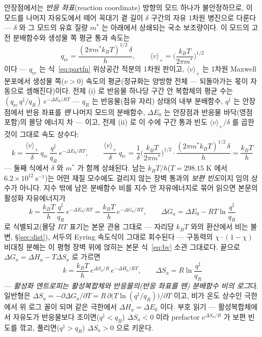 \begin{bgbox}
안장점에서는 \emph{반응 좌표}(reaction coordinate) 방향의 모드 하나가 불안정하므로, 이 모드를 나머지
자유도에서 떼어 꼭대기 곁 길이 $\delta$ 구간의 자유 1차원 병진으로 다룬다 --- $\delta$ 와 그 모드의
유효 질량 $m^{*}$ 는 아래에서 상쇄되는 국소 보조량이다. 이 모드의 고전 분배함수와 생성물 쪽 평균
통과 속도는
\begin{equation}
q_\mathrm{rc}=\frac{(2\pi m^{*}k_BT)^{1/2}\,\delta}{h},\qquad
\langle v\rangle_{+}=\Big(\frac{k_BT}{2\pi m^{*}}\Big)^{\!1/2}
\label{eq:tst-qrc}
\end{equation}
이다 --- $q_\mathrm{rc}$ 는 식~\eqref{eq:partfn} 위상공간 적분의 1차원 판이고, $\langle v\rangle_{+}$ 는
1차원 Maxwell 분포에서 생성물 쪽($v>0$) 속도의 평균(정규화는 양방향 전체 --- 되돌아가는 몫이 자동으로
셈해진다)이다. 전제 (i) 로 반응물 하나당 구간 안 복합체의 평균 수는
$(q_\mathrm{rc}\,q^{\ddagger}/q_R)\,e^{-\Delta E_0/RT}$ --- $q_R$ 는 반응물(점유 자리) 상태의 내부
분배함수, $q^{\ddagger}$ 는 안장점에서 반응 좌표를 \emph{뗀} 나머지 모드의 분배함수, $\Delta E_0$ 는
안장점과 반응물 바닥(영점 포함)의 몰당 에너지 차 --- 이고, 전제 (ii) 로 이 수에 구간 통과 빈도
$\langle v\rangle_{+}/\delta$ 를 곱한 것이 그대로 속도 상수다:
\begin{equation}
k=\frac{\langle v\rangle_{+}}{\delta}\,q_\mathrm{rc}\,\frac{q^{\ddagger}}{q_R}\,e^{-\Delta E_0/RT},
\qquad
\frac{\langle v\rangle_{+}}{\delta}\,q_\mathrm{rc}
=\frac{1}{\delta}\Big(\frac{k_BT}{2\pi m^{*}}\Big)^{\!1/2}
\cdot\frac{(2\pi m^{*}k_BT)^{1/2}\,\delta}{h}
=\frac{k_BT}{h}
\label{eq:tst-freq}
\end{equation}
--- 둘째 식에서 $\delta$ 와 $m^{*}$ 가 함께 상쇄된다. 남는 $k_BT/h$($T=298.15$ K 에서
$6.2\times10^{12}\ \mathrm{s^{-1}}$)는 어떤 재질 모수에도 걸리지 않는 장벽 통과의 \emph{보편 빈도}이지
임의 상수가 아니다\cite{mcquarrie1976}. 지수 밖에 남은 분배함수 비를 지수 안 자유에너지로 묶어 읽으면
본문의 활성화 자유에너지가
\begin{equation}
k=\frac{k_BT}{h}\,\frac{q^{\ddagger}}{q_R}\,e^{-\Delta E_0/RT}
=\frac{k_BT}{h}\,e^{-\Delta G_a/RT},
\qquad
\Delta G_a=\Delta E_0-RT\ln\frac{q^{\ddagger}}{q_R}
\label{eq:tst-k}
\end{equation}
로 식별되고(몰당 $RT$ 표기는 본문 관용 그대로 --- 자리당 $k_BT$ 와의 환산에서 비는 불변,
\S\ref{sec:dist}), 서두의 Eyring 속도식이 그대로 회수된다 --- 구동력의 $\chi\!\cdot\!(1{-}\chi)$
비대칭 분해는 이 평형 장벽 위에 얹히는 본문 식~\eqref{eq:bv} 소관 그대로다. 끝으로
$\Delta G_a=\Delta H_a-T\Delta S_a$ 로 가르면
\begin{equation}
\boxed{\;k=\frac{k_BT}{h}\,e^{\Delta S_a/R}\,e^{-\Delta H_a/RT},\qquad
\Delta S_a=R\ln\frac{q^{\ddagger}}{q_R}\;}
\label{eq:tst-eyring}
\end{equation}
--- \emph{활성화 엔트로피는 활성복합체와 반응물의(반응 좌표를 뗀) 분배함수 비의 로그}다. 일반형은
$\Delta S_a=-\partial\Delta G_a/\partial T=R\,\partial\big(T\ln(q^{\ddagger}/q_R)\big)/\partial T$ 이고,
비가 온도 상수인 극한에서 위 로그 꼴이 되며 같은 극한에서 $\Delta H_a=\Delta E_0$ 이다. 부호 읽기 ---
활성복합체에서 자유도가 반응물보다 조이면($q^{\ddagger}<q_R$) $\Delta S_a<0$ 이라 prefactor
$e^{\Delta S_a/R}$ 가 보편 빈도를 깎고, 풀리면($q^{\ddagger}>q_R$) $\Delta S_a>0$ 으로 키운다.


\end{bgbox}

